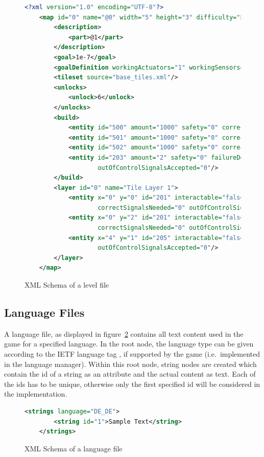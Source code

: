 \begin{figure}
\begin{lstlisting}[language=XML,label={lst:level-xml}]
    <?xml version="1.0" encoding="UTF-8"?>
    <map id="0" name="@0" width="5" height="3" difficulty="EASY">
        <description>
            <part>@1</part>
        </description>
        <goal>1e-7</goal>
        <goalDefinition workingActuators="1" workingSensors="0" workingComputers="0"/>
        <tileset source="base_tiles.xml"/>
        <unlocks>
            <unlock>6</unlock>
        </unlocks>
        <build>
            <entity id="500" amount="1000" safety="0" correctSignalsNeeded="1" outOfControlSignalsAccepted="0"/>
            <entity id="501" amount="1000" safety="0" correctSignalsNeeded="1" outOfControlSignalsAccepted="0"/>
            <entity id="502" amount="1000" safety="0" correctSignalsNeeded="1" outOfControlSignalsAccepted="0"/>
            <entity id="203" amount="2" safety="0" failureDetectionRatio="1" correctSignalsNeeded="1"
                    outOfControlSignalsAccepted="0"/>
        </build>
        <layer id="0" name="Tile Layer 1">
            <entity x="0" y="0" id="201" interactable="false" safety="1e-4" failureDetectionRatio="1"
                    correctSignalsNeeded="0" outOfControlSignalsAccepted="0"/>
            <entity x="0" y="2" id="201" interactable="false" safety="1e-4" failureDetectionRatio="1"
                    correctSignalsNeeded="0" outOfControlSignalsAccepted="0"/>
            <entity x="4" y="1" id="205" interactable="false" safety="0" failureDetectionRatio="1" correctSignalsNeeded="2"
                    outOfControlSignalsAccepted="0"/>
        </layer>
    </map>
\end{lstlisting}
    \caption{XML Schema of a level file}
    \label{fig:xml-level}
\end{figure}
\subsection{Language Files}\label{subsec:language-files}
A language file, as displayed in figure~\ref{fig:xml-lang} contains all text content used in the game for a specified language.
In the root node, the language type can be given according to the IETF language tag , if supported by the game (i.e.\ implemented in the language manager).
Within this root node, string nodes are created which contain the id of a string as an attribute and the actual content as text.
Each of the ids has to be unique, otherwise only the first specified id will be considered in the implementation.
\\
\begin{figure}
\begin{lstlisting}[language=XML,label={lst:lang-xml}]
    <strings language="DE_DE">
        <string id="1">Sample Text</string>
    </strings>
\end{lstlisting}
    \caption{XML Schema of a language file}
    \label{fig:xml-lang}
\end{figure}

